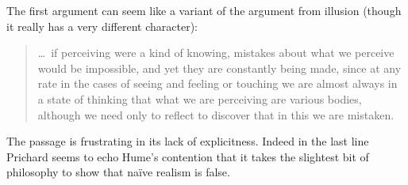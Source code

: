The first argument can seem like a variant of the argument from illusion (though it really has a very different character): 
\begin{quote}
	\ldots\ if perceiving were a kind of knowing, mistakes about what we perceive would be impossible, and yet they are constantly being made, since at any rate in the cases of seeing and feeling or touching we are almost always in a state of thinking that what we are perceiving are various bodies, although we need only to reflect to discover that in this we are mistaken. \citep[]{Prichard:1938ve}
\end{quote}
The passage is frustrating in its lack of explicitness. Indeed in the last line Prichard seems to echo Hume’s contention that it takes the slightest bit of philosophy to show that naïve realism is false. 

